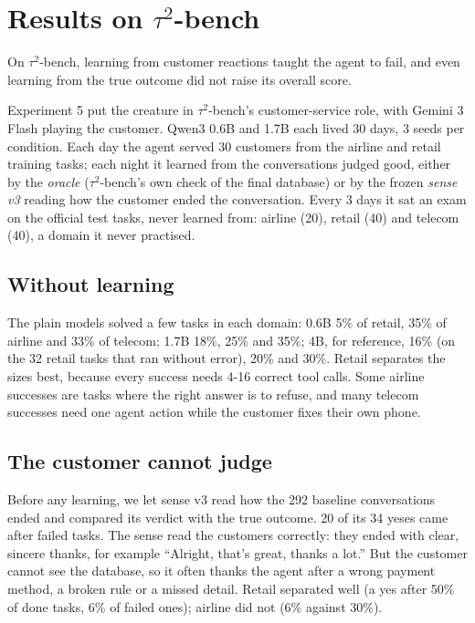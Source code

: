 \section{Results on $\tau^2$-bench}

On $\tau^2$-bench, learning from customer reactions taught the agent to fail, and even learning from the true outcome did not raise its overall score.

Experiment 5 put the creature in $\tau^2$-bench's customer-service role, with Gemini 3 Flash playing the customer. Qwen3 0.6B and 1.7B each lived 30 days, 3 seeds per condition. Each day the agent served 30 customers from the airline and retail training tasks; each night it learned from the conversations judged good, either by the \emph{oracle} ($\tau^2$-bench's own check of the final database) or by the frozen \emph{sense v3} reading how the customer ended the conversation. Every 3 days it sat an exam on the official test tasks, never learned from: airline (20), retail (40) and telecom (40), a domain it never practised.

\subsection{Without learning}

The plain models solved a few tasks in each domain: 0.6B 5\% of retail, 35\% of airline and 33\% of telecom; 1.7B 18\%, 25\% and 35\%; 4B, for reference, 16\% (on the 32 retail tasks that ran without error), 20\% and 30\%. Retail separates the sizes best, because every success needs 4-16 correct tool calls. Some airline successes are tasks where the right answer is to refuse, and many telecom successes need one agent action while the customer fixes their own phone.

\subsection{The customer cannot judge}

Before any learning, we let sense v3 read how the 292 baseline conversations ended and compared its verdict with the true outcome. 20 of its 34 yeses came after failed tasks. The sense read the customers correctly: they ended with clear, sincere thanks, for example ``Alright, that's great, thanks a lot.'' But the customer cannot see the database, so it often thanks the agent after a wrong payment method, a broken rule or a missed detail. Retail separated well (a yes after 50\% of done tasks, 6\% of failed ones); airline did not (6\% against 30\%).

